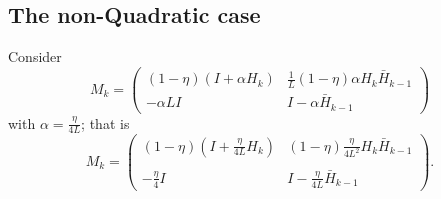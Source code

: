 \documentclass[11pt]{article}
\begin{document}
% 
% 
% 
% 
% 

 \subsection{The non-Quadratic case}
\noindent 
Consider
\[
 M_k = \begin{pmatrix} (1-\eta)(I+\alpha H_k) & \displaystyle\frac{1}{L} (1-\eta)\alpha H_k\bar H_{k-1}\\  
                   -\alpha LI  & I-\alpha\bar H_{k-1} \end{pmatrix}                  
\]
with $\alpha=\displaystyle\frac{\eta}{4L}$; that is
\[
 M_k = \begin{pmatrix} (1-\eta)(I+\displaystyle\frac{\eta}{4L} H_k) & (1-\eta)\displaystyle\frac{\eta}{4L^2} H_k\bar H_{k-1}\\  
 \\
                   -\displaystyle\frac{\eta}{4} I  & I-\displaystyle\frac{\eta}{4L}\bar H_{k-1} \end{pmatrix}.                  
\]
\end{document}
